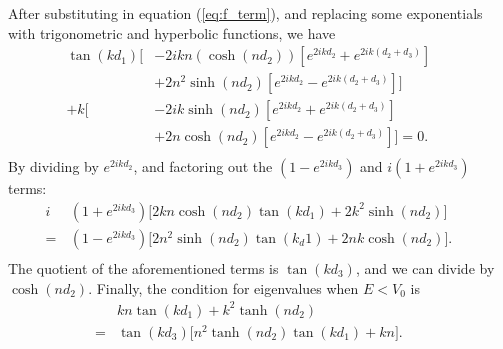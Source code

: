 \documentclass[aps,twocolumn,secnumarabic,nobalancelastpage,amsmath,amssymb,
nofootinbib]{revtex4}
\begin{document}
%
After substituting in equation (\ref{eq:f_term}), and replacing some
exponentials with trigonometric and hyperbolic functions, we have
\begin{align}
\nonumber
\tan(kd_1)\big[&-2ikn(\cosh(nd_2))[e^{2ikd_2}+e^{2ik(d_2+d_3)}]&&\\
\nonumber
&+2n^2 \sinh(nd_2)[e^{2ikd_2}-e^{2ik(d_2+d_3)}]\big]&&\\
\nonumber
+k\big[&-2ik\sinh(nd_2)[e^{2ikd_2}+e^{2ik(d_2+d_3)}]&&\\
\nonumber
&+2n\cosh(nd_2)[e^{2ikd_2}-e^{2ik(d_2+d_3)}]\big] = 0.&&\\
\end{align}
%
By dividing by $e^{2ikd_2}$, and factoring out the $(1-e^{2ikd_3})$ and
$i(1+e^{2ikd_3})$ terms:
\begin{align}
\nonumber
i&(1+e^{2ikd_3})\big[2kn\cosh(nd_2)\tan(kd_1)+2k^2\sinh(nd_2)\big]&&\\
\nonumber
=\,&(1-e^{2ikd_3})\big[2n^2\sinh(nd_2)\tan(k_d1)+2nk\cosh(nd_2)\big].&&\\
\end{align}
%
The quotient of the aforementioned terms is $\tan(kd_3)$, and we can divide
by $\cosh(nd_2)$. Finally, the condition for eigenvalues when $E<V_0$ is
\begin{align}
\nonumber
&kn\tan(kd_1)+k^2\tanh(nd_2)&&\\
\nonumber
=&\tan(kd_3)\big[n^2\tanh(nd_2)\tan(kd_1)+kn\big].&&\\
\end{align}
\end{document}
